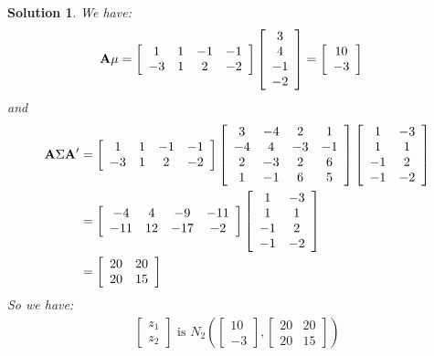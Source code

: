 \documentclass[11pt]{article}
\newtheorem{sol}{Solution}
\begin{document}
\begin{sol}
	We have:
	\begin{align*}
		{\bf A}{\bf \mu} &= \left[\begin{array}{cccc}1&1&-1&-1\\ -3&1&2&-2 \end{array}\right]\left[\begin{array}{c} 3\\ 4\\ -1\\ -2\end{array}\right] = \left[\begin{array}{c}10 \\ -3\end{array}\right]
	\end{align*}
	and
	\begin{align*}
		{\bf A}\Sigma{\bf A}' &= \left[\begin{array}{cccc}1&1&-1&-1\\ -3&1&2&-2 \end{array}\right]\left[\begin{array}{cccc} 3&-4&2& 1\\ -4&4&-3&-1 \\ 2&-3&2&6\\ 1&-1&6&5 \end{array}\right]\left[\begin{array}{cc} 1&-3 \\ 1& 1\\ -1&2 \\ -1& -2\end{array}\right]\\
		&= \left[\begin{array}{cccc} -4&4&-9&-11 \\ -11&12&-17&-2 \end{array}\right]\left[\begin{array}{cc} 1&-3 \\ 1& 1\\ -1&2 \\ -1& -2\end{array}\right]\\
		&= \left[\begin{array}{cc} 20& 20\\ 20& 15\end{array}\right]
	\end{align*}
	So we have:
	\begin{align*}
		\left[\begin{array}{c} z_1\\ z_2\end{array}\right] \text{ is } N_2(\left[\begin{array}{c}10 \\ -3\end{array}\right], \left[\begin{array}{cc} 20& 20\\ 20& 15\end{array}\right])

\end{align*}
\end{sol}
\end{document}
